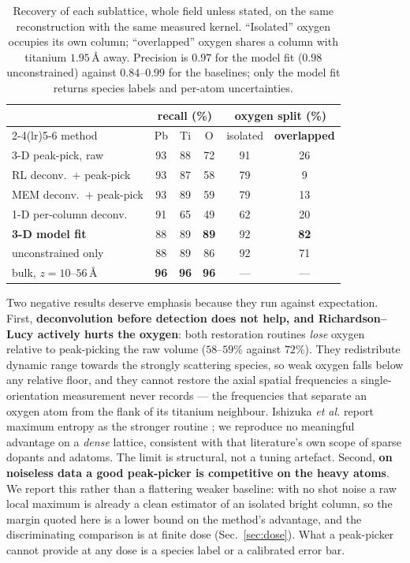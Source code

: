 \documentclass[aps,prb,twocolumn,superscriptaddress,floatfix,nofootinbib]{revtex4-2}
\begin{document}
\begin{table}[t]
  \centering \small
  \begin{tabular}{@{}lccccc@{}}
    \toprule
    & \multicolumn{3}{c}{recall (\%)} & \multicolumn{2}{c}{oxygen split (\%)} \\
    \cmidrule(lr){2-4}\cmidrule(lr){5-6}
    method & Pb & Ti & O & isolated & \textbf{overlapped} \\
    \midrule
    3-D peak-pick, raw            & 93 & 88 & 72 & 91 & 26 \\
    RL deconv.\ $+$ peak-pick     & 93 & 87 & 58 & 79 & \phantom{0}9 \\
    MEM deconv.\ $+$ peak-pick    & 93 & 89 & 59 & 79 & 13 \\
    1-D per-column deconv.        & 91 & 65 & 49 & 62 & 20 \\
    \textbf{3-D model fit}        & 88 & 89 & \textbf{89} & 92 & \textbf{82} \\
    \quad unconstrained only      & 88 & 89 & 86 & 92 & 71 \\
    \quad bulk, $z=10$--$56$\,\AA & \textbf{96} & \textbf{96} & \textbf{96} & --- & --- \\
    \bottomrule
  \end{tabular}
  \caption{Recovery of each sublattice, whole field unless stated, on the same reconstruction
    with the same measured kernel. ``Isolated'' oxygen occupies its own column; ``overlapped''
    oxygen shares a column with titanium $1.95$\,\AA{} away. Precision is $0.97$ for the model
    fit ($0.98$ unconstrained) against $0.84$--$0.99$ for the baselines; only the model fit
    returns species labels and per-atom uncertainties.}
  \label{tab:detect}
\end{table}

Two negative results deserve emphasis because they run against expectation.
First, \textbf{deconvolution before detection does not help, and Richardson--Lucy actively
hurts the oxygen}: both restoration routines \emph{lose} oxygen relative to peak-picking the
raw volume ($58$--$59\%$ against $72\%$). They redistribute dynamic range towards the strongly
scattering species, so weak oxygen falls below any relative floor, and they cannot restore the
axial spatial frequencies a single-orientation measurement never records --- the frequencies
that separate an oxygen atom from the flank of its titanium neighbour. Ishizuka \emph{et al.}
report maximum entropy as the stronger routine \citep{Ishizuka2021}; we reproduce no meaningful
advantage on a \emph{dense} lattice, consistent with that literature's own scope of sparse
dopants and adatoms. The limit is structural, not a tuning artefact.
Second, \textbf{on noiseless data a good peak-picker is competitive on the heavy atoms}. We
report this rather than a flattering weaker baseline: with no shot noise a raw local maximum is
already a clean estimator of an isolated bright column, so the margin quoted here is a lower
bound on the method's advantage, and the discriminating comparison is at finite dose
(Sec.~\ref{sec:dose}). What a peak-picker cannot provide at any dose is a species label or a
calibrated error bar.
\end{document}
